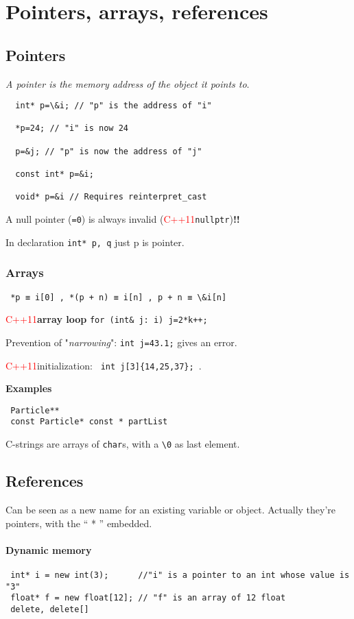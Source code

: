 \documentclass{article}
\newcommand{\code}[1]{\texttt {#1}}
\newcommand{\cxi}{\textcolor{red}{C++11}}
\newcommand{\caut}{\textbf{!!}}
\begin{document}
\section{Pointers, arrays, references}

\subsection{Pointers}
\textit{A pointer is the memory address of the object it points to}.
\begin{lstlisting}
  int* p=\&i; // "p" is the address of "i"

  *p=24; // "i" is now 24

  p=&j; // "p" is now the address of "j"

  const int* p=&i;

  void* p=&i // Requires reinterpret_cast
\end{lstlisting}
A null pointer (\code{=0}) is always invalid (\cxi \code{nullptr})\caut

In declaration \code{int* p, q} just p is pointer.

\subsubsection{Arrays}
\begin{lstlisting}
 *p ≡ i[0] , *(p + n) ≡ i[n] , p + n ≡ \&i[n]
\end{lstlisting}
\cxi \textbf{array loop} \code{for (int\& j: i) j=2*k++;}

Prevention of "\textit{narrowing}": \code{int j={43.1};} gives an error.

\cxi initialization: \code{ int j[3]\{14,25,37\}; }.

\textbf{Examples}
\begin{lstlisting}
 Particle**
 const Particle* const * partList 
\end{lstlisting}
C-strings are arrays of \code{char}s, with a \code{\textbackslash0} as last element. 



\subsection{References}
Can be seen as a new name for an existing variable or object.
Actually they’re pointers, with the “ * ” embedded.
\paragraph{Dynamic memory}
\begin{lstlisting}
 int* i = new int(3);      //"i" is a pointer to an int whose value is "3"
 float* f = new float[12]; // "f" is an array of 12 float
 delete, delete[]
\end{lstlisting}
\end{document}
